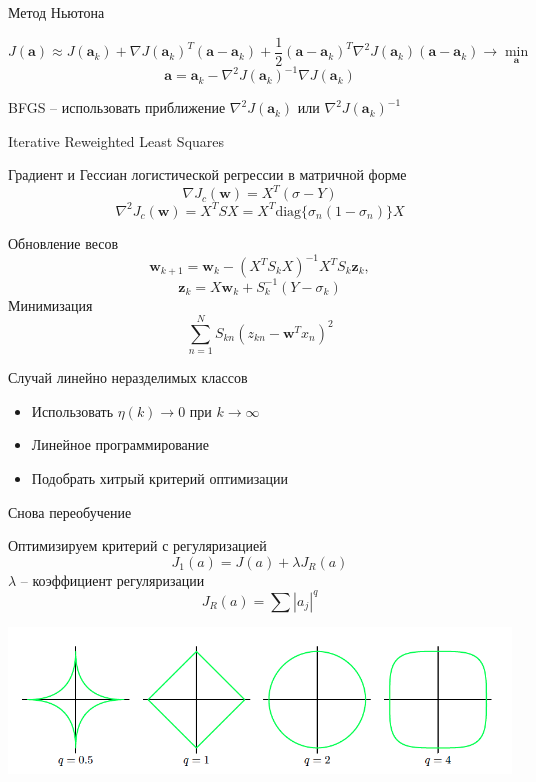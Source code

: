 \documentclass[aspectratio=169]{beamer}
\begin{document}
\begin{frame}{Метод Ньютона}

\begin{small}
\[
J(\mathbf{a}) \approx J(\mathbf{a}_k) + \nabla J(\mathbf{a}_k)^T (\mathbf{a} - \mathbf{a}_k) + \frac 1 2 (\mathbf{a} - \mathbf{a}_k)^T \nabla^2 J(\mathbf{a}_k) (\mathbf{a} - \mathbf{a}_k) \rightarrow \min_{\mathbf{a}}
\]
\[
\mathbf{a} = \mathbf{a}_k - \nabla^2 J(\mathbf{a}_k)^{-1} \nabla J(\mathbf{a}_k)
\]

\newton

BFGS -- использовать приближение $\nabla^2 J(\mathbf{a}_k)$ или $\nabla^2 J(\mathbf{a}_k)^{-1}$
\end{small}

\end{frame}

\begin{frame}{Iterative Reweighted Least Squares}

Градиент и Гессиан логистической регрессии в матричной форме
\[
\nabla J_c(\mathbf{w}) = X^T (\sigma - Y)
\]
\[
\nabla^2 J_c(\mathbf{w}) = X^T S X = X^T \text{diag}\{\sigma_n (1 - \sigma_n)\} X
\]

Обновление весов
\[
\mathbf{w}_{k+1} = \mathbf{w}_k - (X^T S_k X)^{-1} X^T S_k \mathbf{z}_k,
\]
\[
\mathbf{z}_k = X \mathbf{w}_k + S^{-1}_k (Y - \sigma_k)
\]
Минимизация
\[
\sum_{n=1}^N S_{kn} (z_{kn} - \mathbf{w}^T x_n)^2
\]

\end{frame}

\begin{frame}{Случай линейно неразделимых классов}

\begin{itemize}
\item Использовать $\eta(k) \rightarrow 0$ при $k \rightarrow \infty$
\item Линейное программирование
\item Подобрать хитрый критерий оптимизации
\end{itemize}

\end{frame}

\begin{frame}{Снова переобучение}

Оптимизируем критерий с регуляризацией
\[
J_1(a) = J(a) + \lambda J_R(a)
\]
$\lambda$ -- коэффициент регуляризации
\[
J_R(a) = \sum |a_j|^q
\]
\begin{center}
\includegraphics[scale=0.3]{images/regularization.png}
\end{center}

\end{frame}
\end{document}
